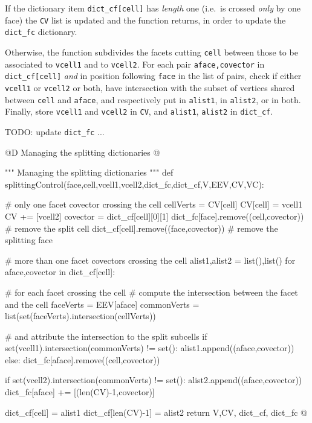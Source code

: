 \documentclass[11pt,oneside]{article}	%
\begin{document}
If the dictionary item \texttt{dict\_cf[cell]} has \emph{length} one (i.e.~is crossed  \emph{only} by one face) the \texttt{CV} list is updated and the function returns, in order to update the \texttt{dict\_fc} dictionary.

Otherwise, the function subdivides the facets cutting \texttt{cell} between those to be associated to \texttt{vcell1} and to \texttt{vcell2}. 
For each pair \texttt{aface,covector} in \texttt{dict\_cf[cell]} \emph{and} in position following \texttt{face} in the list of pairs, check if either \texttt{vcell1} or \texttt{vcell2} or both, have intersection with the subset of vertices shared between \texttt{cell} and \texttt{aface}, and respectively put in \texttt{alist1}, in \texttt{alist2}, or in both.
Finally, store \texttt{vcell1} and \texttt{vcell2} in \texttt{CV}, and \texttt{alist1}, \texttt{alist2} in \texttt{dict\_cf}.

TODO: update \texttt{dict\_fc} ...

@D Managing the splitting dictionaries
@{""" Managing the splitting dictionaries """
def splittingControl(face,cell,vcell1,vcell2,dict_fc,dict_cf,V,EEV,CV,VC):

	# only one facet covector crossing the cell
	cellVerts = CV[cell]
	CV[cell] = vcell1
	CV += [vcell2]
	covector = dict_cf[cell][0][1]
	dict_fc[face].remove((cell,covector))   # remove the split cell
	dict_cf[cell].remove((face,covector))   # remove the splitting face
			
	# more than one facet covectors crossing the cell
	alist1,alist2 = list(),list()
	for aface,covector in dict_cf[cell]:
	
		# for each facet crossing the cell
		# compute the intersection between the facet and the cell
		faceVerts = EEV[aface]
		commonVerts = list(set(faceVerts).intersection(cellVerts))
		
		# and attribute the intersection to the split subcells
		if set(vcell1).intersection(commonVerts) != set():
			alist1.append((aface,covector))
		else: dict_fc[aface].remove((cell,covector)) 
				
		if set(vcell2).intersection(commonVerts) != set():
			alist2.append((aface,covector))
			dict_fc[aface] += [(len(CV)-1,covector)]
	
	dict_cf[cell] = alist1	
	dict_cf[len(CV)-1] = alist2
	return V,CV, dict_cf, dict_fc
@}
\end{document}
